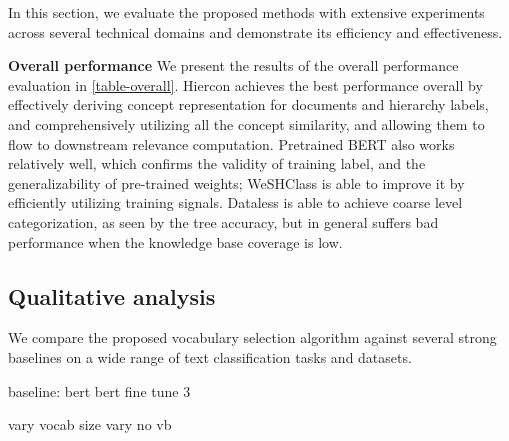 In this section, we evaluate the proposed methods with extensive experiments across several technical domains and demonstrate its efficiency and effectiveness. 


\noindent \textbf{Overall performance}
We present the results of the overall performance evaluation in \autoref{table-overall}. Hiercon achieves the best performance overall by effectively deriving concept representation for documents and hierarchy labels, 
and comprehensively utilizing all the concept similarity,
and allowing them to flow to downstream relevance computation.
Pretrained BERT also works relatively well, which confirms the validity of training label, and the generalizability of pre-trained weights; 
WeSHClass is able to improve it by efficiently utilizing training signals.
Dataless is able to achieve coarse level categorization, as seen 
by the tree accuracy, but in general suffers bad performance when  the knowledge base coverage is low.





\subsection{Qualitative analysis}

We compare the proposed vocabulary selection algorithm against several strong baselines on a wide range of text classification tasks and datasets. 

baseline: bert
bert fine tune 3

vary vocab size
vary no vb




